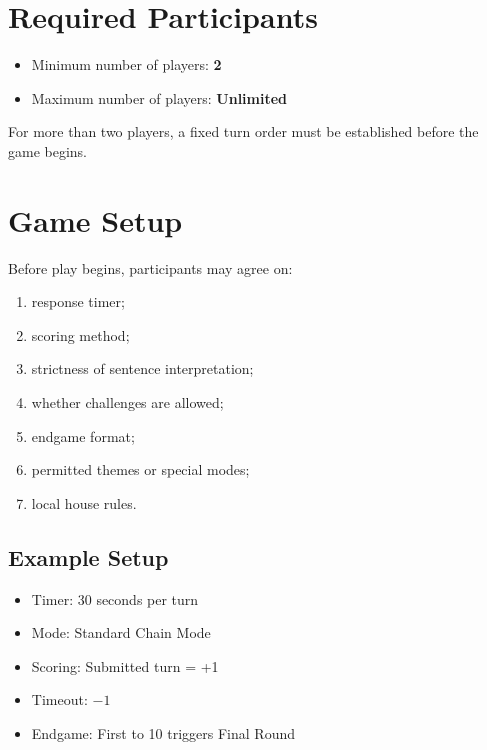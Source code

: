 \documentclass[11pt,a4paper]{article}
\begin{document}
\section{Required Participants}

\begin{itemize}
    \item Minimum number of players: \textbf{2}
    \item Maximum number of players: \textbf{Unlimited}
\end{itemize}

For more than two players, a fixed turn order must be established before the game begins.

\section{Game Setup}

Before play begins, participants may agree on:

\begin{enumerate}
    \item response timer;
    \item scoring method;
    \item strictness of sentence interpretation;
    \item whether challenges are allowed;
    \item endgame format;
    \item permitted themes or special modes;
    \item local house rules.
\end{enumerate}

\subsection{Example Setup}

\begin{itemize}
    \item Timer: 30 seconds per turn
    \item Mode: Standard Chain Mode
    \item Scoring: Submitted turn = +1
    \item Timeout: $-1$
    \item Endgame: First to 10 triggers Final Round
\end{itemize}

\end{document}
